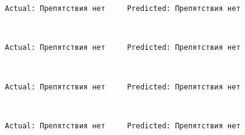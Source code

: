 \documentclass[11pt]{article}
\begin{document}
    \begin{Verbatim}[commandchars=\\\{\}]
Actual: Препятствия нет     Predicted: Препятствия нет

    \end{Verbatim}

    \begin{center}
    \end{center}
    { \hspace*{\fill} \\}
    
    \begin{Verbatim}[commandchars=\\\{\}]
Actual: Препятствия нет     Predicted: Препятствия нет

    \end{Verbatim}

    \begin{center}
    \end{center}
    { \hspace*{\fill} \\}
    
    \begin{Verbatim}[commandchars=\\\{\}]
Actual: Препятствия нет     Predicted: Препятствия нет

    \end{Verbatim}

    \begin{center}
    \end{center}
    { \hspace*{\fill} \\}
    
    \begin{Verbatim}[commandchars=\\\{\}]
Actual: Препятствия нет     Predicted: Препятствия нет

    \end{Verbatim}

    \begin{center}
    \end{center}
    { \hspace*{\fill} \\}
    
\end{document}
